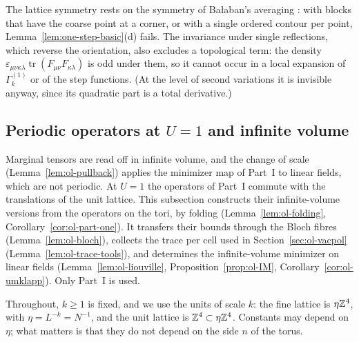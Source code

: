 The lattice symmetry rests on the symmetry of Ba\l aban's averaging \cite[(0.3)--(0.12)]{BalYM4I}: with blocks that have the coarse point at a corner, or with a single ordered contour per point, Lemma~\ref{lem:one-step-basic}(d) fails. The invariance under single reflections, which reverse the orientation, also excludes a topological term: the density $\varepsilon_{\mu\nu\kappa\lambda}\operatorname{tr}(F_{\mu\nu}F_{\kappa\lambda})$ is odd under them, so it cannot occur in a local expansion of $\Gamma^{(1)}_k$ or of the step functions. (At the level of second variations it is invisible anyway, since its quadratic part is a total derivative.)

\subsection{Periodic operators at \texorpdfstring{$U=1$}{U=1} and infinite volume}\label{subsec:ol-infinite-volume}

Marginal tensors are read off in infinite volume, and the change of scale (Lemma~\ref{lem:ol-pullback}) applies the minimizer map of Part~I to linear fields, which are not periodic. At $U=1$ the operators of Part~I commute with the translations of the unit lattice. This subsection constructs their infinite-volume versions from the operators on the tori, by folding (Lemma~\ref{lem:ol-folding}, Corollary~\ref{cor:ol-part-one}). It transfers their bounds through the Bloch fibres (Lemma~\ref{lem:ol-bloch}), collects the trace per cell used in Section~\ref{sec:ol-vacpol} (Lemma~\ref{lem:ol-trace-tools}), and determines the infinite-volume minimizer on linear fields (Lemma~\ref{lem:ol-liouville}, Proposition~\ref{prop:ol-IM}, Corollary~\ref{cor:ol-umklapp}). Only Part~I is used.

Throughout, $k\ge1$ is fixed, and we use the units of scale $k$: the fine lattice is $\eta\mathbb Z^4$, with $\eta=L^{-k}=N^{-1}$, and the unit lattice is $\mathbb Z^4\subset\eta\mathbb Z^4$. Constants may depend on $\eta$; what matters is that they do not depend on the side $n$ of the torus.


